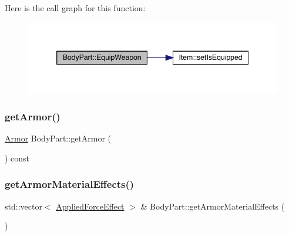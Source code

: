 Here is the call graph for this function\+:
\nopagebreak
\begin{figure}[H]
\begin{center}
\leavevmode
\includegraphics[width=346pt]{d2/d6f/class_body_part_a6af5139c60c7b96bff6d8768c9ef8f22_cgraph}
\end{center}
\end{figure}
\mbox{\label{class_body_part_a84df009b0da129c07a84a50e083f33d8}} 
\subsubsection{\texorpdfstring{get\+Armor()}{getArmor()}}
{\footnotesize\ttfamily \mbox{\hyperlink{class_armor}{Armor}} Body\+Part\+::get\+Armor (\begin{DoxyParamCaption}{ }\end{DoxyParamCaption}) const}

\mbox{\label{class_body_part_a7c4d742811e49a2c97b9bec6c1785e94}} 
\subsubsection{\texorpdfstring{get\+Armor\+Material\+Effects()}{getArmorMaterialEffects()}}
{\footnotesize\ttfamily std\+::vector$<$ \mbox{\hyperlink{struct_applied_force_effect}{Applied\+Force\+Effect}} $>$ \& Body\+Part\+::get\+Armor\+Material\+Effects (\begin{DoxyParamCaption}{ }\end{DoxyParamCaption})}

